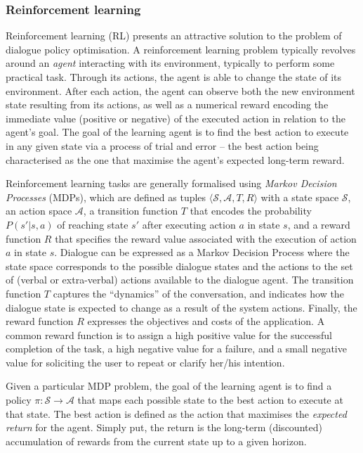 \subsubsection*{Reinforcement learning}

Reinforcement learning (RL) presents an attractive solution to the problem of dialogue policy optimisation.  A reinforcement learning problem typically revolves around an \textit{agent} interacting with its environment, typically to perform some practical task.  Through its actions, the agent is able to change the state of its environment.  After each action, the agent can observe both the new environment state resulting from its actions, as well as a numerical reward encoding the immediate value (positive or negative) of the executed action in relation to the agent's goal. The goal of the learning agent is to find the best action to execute in any given state via a process of trial and error  -- the best action being characterised as the one that maximise the agent's expected long-term reward.  

Reinforcement learning tasks are generally formalised using \textit{Markov Decision Processes} (MDPs), which are defined as tuples $\langle \mathcal{S}, \mathcal{A}, T, R \rangle$ with a state space $\mathcal{S}$, an action space $\mathcal{A}$, a transition function $T$ that encodes  the probability $P(s'|s,a)$ of reaching state $s'$ after executing action $a$ in state $s$, and a reward function $R$ that specifies the reward value associated with the execution of action $a$ in state $s$. Dialogue can be expressed as a Markov Decision Process where the state space corresponds to the possible dialogue states and the actions to the set of (verbal or extra-verbal) actions available to the dialogue agent.  The transition function $T$ captures the ``dynamics'' of the conversation, and indicates how the dialogue state is expected to change as a result of the system actions. Finally, the reward function $R$ expresses the objectives and costs of the application. A common reward function is to assign a high positive value for the successful completion of the task, a high negative value for a failure, and a small negative value for soliciting the user to repeat or clarify her/his intention.  

Given a particular MDP problem, the goal of the learning agent is to find a policy $\pi: \mathcal{S} \rightarrow \mathcal{A}$ that maps each possible state to the best action to execute at that state.  The best action is defined as the action that maximises the \textit{expected return} for the agent.  Simply put, the return is the long-term (discounted) accumulation of rewards from the current state up to a given horizon. 

